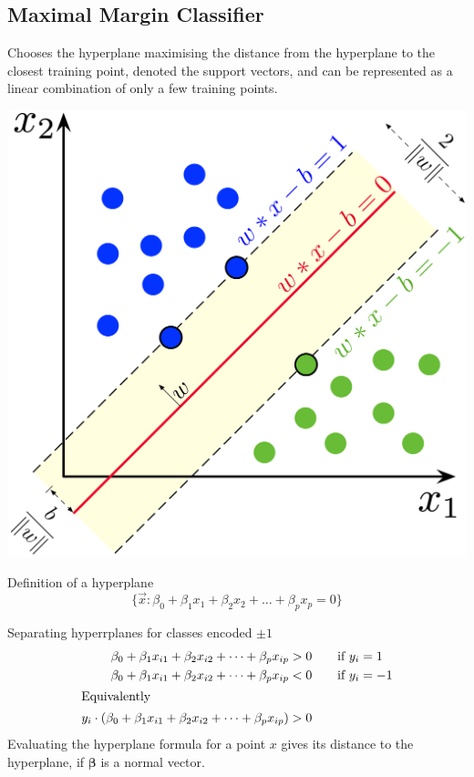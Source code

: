 \documentclass[11pt]{article}
\theoremstyle{definition}
\begin{document}
\subsection{Maximal Margin Classifier}
\begin{minipage}{0.6\linewidth}
	Chooses the hyperplane maximising the distance from the hyperplane to the closest training point, denoted the support vectors, and can be represented as a linear combination of only a few training points.
\end{minipage}
\begin{minipage}{0.4\linewidth}
	\centering
	\includegraphics[keepaspectratio,width=0.8\linewidth]{img/maximum_margin_classifier.png}
\end{minipage}

\begin{definition}
	Definition of a hyperplane
	\begin{equation*}
		\{ \vec{x}: \beta_0 + \beta_1 x_1 + \beta_2 x_2 + \dots + \beta_p x_p = 0 \}
	\end{equation*}
\end{definition}
Separating hyperrplanes for classes encoded $\pm 1$
\begin{align*}
	\beta_0 + \beta_1 x_{i1} + \beta_2 x_{i2} + \dots + \beta_p x_{ip} &> 0 \qquad \text{if}\ y_i = 1\\
	\beta_0 + \beta_1 x_{i1} + \beta_2 x_{i2} + \dots + \beta_p x_{ip} &< 0 \qquad \text{if}\ y_i = -1\\
	\intertext{Equivalently}
	y_i\cdot (\beta_0 + \beta_1 x_{i1} + \beta_2 x_{i2} + \dots + \beta_p x_{ip}) &> 0
\end{align*}
Evaluating the hyperplane formula for a point $x$ gives its distance to the hyperplane, if $\bm{\beta}$ is a normal vector.
\end{document}
